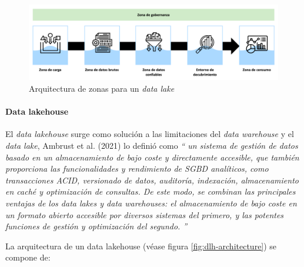 \begin{figure}[h!]
    \centering
    \includegraphics[width=\textwidth]{Images/zone-architecture.png}
    \caption{Arquitectura de zonas para un \textit{data lake}}
    \label{fig:zone-architecture}
\end{figure}


\paragraph{Data lakehouse\newline}

El \textit{data lakehouse} surge como solución a las limitaciones del \textit{data warehouse} y el \textit{data lake}, 
Ambrust et al. (2021) \cite{armbrust2021lakehouse} lo definió como
\textit{`` 
un sistema de gestión de datos basado en un almacenamiento de bajo coste y directamente accesible, 
que también proporciona las funcionalidades y rendimiento de SGBD analíticos, 
como transacciones ACID, versionado de datos, auditoría, indexación, almacenamiento en caché y optimización de consultas. 
De este modo, se combinan las principales ventajas de los data lakes y data warehouses: 
el almacenamiento de bajo coste en un formato abierto accesible por diversos sistemas del primero, y las potentes funciones de gestión y optimización del segundo.
''}

La arquitectura de un data lakehouse (véase figura \ref{fig:dlh-architecture}) se compone de:

